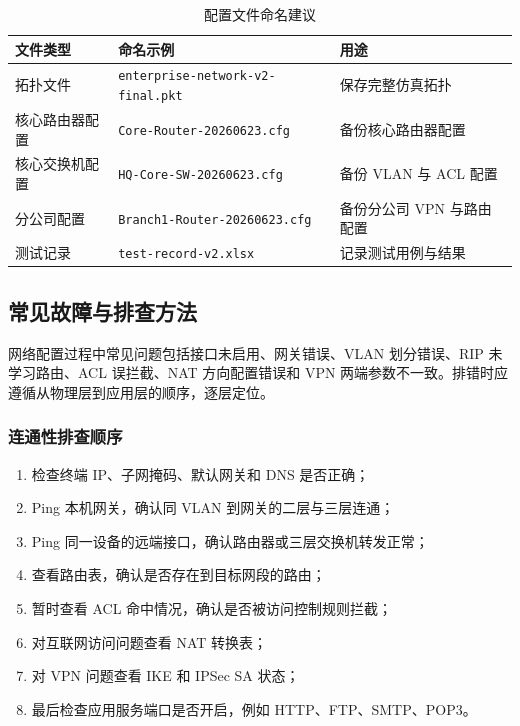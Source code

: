 \documentclass[12pt,a4paper]{ctexart}
\begin{document}
\begin{table}[H]
\centering
\caption{配置文件命名建议}
\label{tab:config-version}
\begin{tabular}{|p{4cm}|p{5cm}|p{5cm}|}
\hline
\textbf{文件类型} & \textbf{命名示例} & \textbf{用途} \\ \hline
拓扑文件 & \texttt{enterprise-network-v2-final.pkt} & 保存完整仿真拓扑 \\ \hline
核心路由器配置 & \texttt{Core-Router-20260623.cfg} & 备份核心路由器配置 \\ \hline
核心交换机配置 & \texttt{HQ-Core-SW-20260623.cfg} & 备份 VLAN 与 ACL 配置 \\ \hline
分公司配置 & \texttt{Branch1-Router-20260623.cfg} & 备份分公司 VPN 与路由配置 \\ \hline
测试记录 & \texttt{test-record-v2.xlsx} & 记录测试用例与结果 \\ \hline
\end{tabular}
\end{table}

\subsection{常见故障与排查方法}

网络配置过程中常见问题包括接口未启用、网关错误、VLAN 划分错误、RIP 未学习路由、ACL 误拦截、NAT 方向配置错误和 VPN 两端参数不一致。排错时应遵循从物理层到应用层的顺序，逐层定位。

\subsubsection{连通性排查顺序}

\begin{enumerate}[label=(\arabic*), leftmargin=2em]
    \item 检查终端 IP、子网掩码、默认网关和 DNS 是否正确；
    \item Ping 本机网关，确认同 VLAN 到网关的二层与三层连通；
    \item Ping 同一设备的远端接口，确认路由器或三层交换机转发正常；
    \item 查看路由表，确认是否存在到目标网段的路由；
    \item 暂时查看 ACL 命中情况，确认是否被访问控制规则拦截；
    \item 对互联网访问问题查看 NAT 转换表；
    \item 对 VPN 问题查看 IKE 和 IPSec SA 状态；
    \item 最后检查应用服务端口是否开启，例如 HTTP、FTP、SMTP、POP3。
\end{enumerate}
\end{document}
